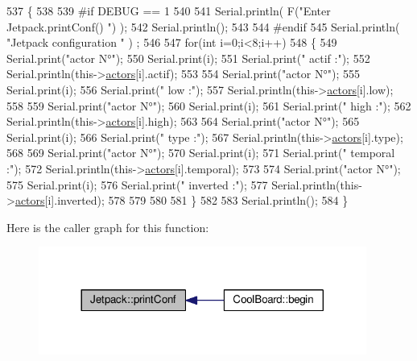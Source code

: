 \begin{DoxyCode}
537 \{
538 
539 \textcolor{preprocessor}{#if DEBUG == 1 }
540 
541     Serial.println( F(\textcolor{stringliteral}{"Enter Jetpack.printConf() "}) );
542     Serial.println();
543 
544 \textcolor{preprocessor}{#endif }
545     Serial.println( \textcolor{stringliteral}{"Jetpack configuration "} ) ;
546  
547         \textcolor{keywordflow}{for}(\textcolor{keywordtype}{int} i=0;i<8;i++)
548     \{   
549         Serial.print(\textcolor{stringliteral}{"actor N°"});
550         Serial.print(i);
551         Serial.print(\textcolor{stringliteral}{" actif :"});
552         Serial.println(this->\hyperlink{class_jetpack_a7e16d2f97837f9712a2e6de1c50d99db}{actors}[i].actif);
553 
554         Serial.print(\textcolor{stringliteral}{"actor N°"});
555         Serial.print(i);
556         Serial.print(\textcolor{stringliteral}{" low :"});
557         Serial.println(this->\hyperlink{class_jetpack_a7e16d2f97837f9712a2e6de1c50d99db}{actors}[i].low);
558 
559         Serial.print(\textcolor{stringliteral}{"actor N°"});
560         Serial.print(i);
561         Serial.print(\textcolor{stringliteral}{" high :"});
562         Serial.println(this->\hyperlink{class_jetpack_a7e16d2f97837f9712a2e6de1c50d99db}{actors}[i].high);
563 
564         Serial.print(\textcolor{stringliteral}{"actor N°"});
565         Serial.print(i);
566         Serial.print(\textcolor{stringliteral}{" type :"});
567         Serial.println(this->\hyperlink{class_jetpack_a7e16d2f97837f9712a2e6de1c50d99db}{actors}[i].type);
568         
569         Serial.print(\textcolor{stringliteral}{"actor N°"});
570         Serial.print(i);
571         Serial.print(\textcolor{stringliteral}{" temporal :"});
572         Serial.println(this->\hyperlink{class_jetpack_a7e16d2f97837f9712a2e6de1c50d99db}{actors}[i].temporal);
573 
574         Serial.print(\textcolor{stringliteral}{"actor N°"});
575         Serial.print(i);
576         Serial.print(\textcolor{stringliteral}{" inverted :"});
577         Serial.println(this->\hyperlink{class_jetpack_a7e16d2f97837f9712a2e6de1c50d99db}{actors}[i].inverted);
578 
579  
580 
581     \}
582 
583     Serial.println();
584 \}
\end{DoxyCode}
Here is the caller graph for this function\+:\nopagebreak
\begin{figure}[H]
\begin{center}
\leavevmode
\includegraphics[width=305pt]{df/d1d/class_jetpack_ac54a7bb4f9166bee32052253d9b1d306_icgraph}
\end{center}
\end{figure}
\mbox{\label{class_jetpack_a338f1af8cbc6504ac69b47c7328569b5}} 
